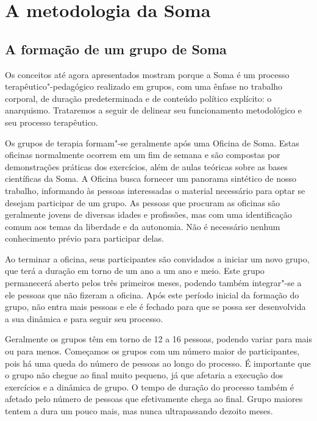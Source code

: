 \chapter*{A metodologia da Soma}

\section{A formação de um grupo de Soma}

Os conceitos até agora apresentados mostram porque a Soma é um processo
terapêutico"-pedagógico realizado em grupos, com uma ênfase no trabalho
corporal, de duração predeterminada e de conteúdo político explícito: o
anarquismo. Trataremos a seguir de delinear seu funcionamento
metodológico e seu processo terapêutico.

Os grupos de terapia formam"-se geralmente após uma Oficina de Soma.
Estas oficinas normalmente ocorrem em um fim de semana e são compostas
por demonstrações práticas dos exercícios, além de aulas teóricas sobre
as bases científicas da Soma. A Oficina busca fornecer um panorama
sintético de nosso trabalho, informando às pessoas interessadas o
material necessário para optar se desejam participar de um grupo. As
pessoas que procuram as oficinas são geralmente jovens de diversas
idades e profissões, mas com uma identificação comum aos temas da
liberdade e da autonomia. Não é necessário nenhum conhecimento prévio
para participar delas.

Ao terminar a oficina, seus participantes são convidados a iniciar um
novo grupo, que terá a duração em torno de um ano a um ano e meio. Este
grupo permanecerá aberto pelos três primeiros meses, podendo também
integrar"-se a ele pessoas que não fizeram a oficina. Após este período
inicial da formação do grupo, não entra mais pessoas e ele é fechado
para que se possa ser desenvolvida a sua dinâmica e para seguir seu
processo.

Geralmente os grupos têm em torno de 12 a 16 pessoas, podendo variar
para mais ou para menos. Começamos os grupos com um número maior de
participantes, pois há uma queda do número de pessoas ao longo do
processo. É importante que o grupo não chegue ao final muito pequeno, já
que afetaria a execução dos exercícios e a dinâmica de grupo. O tempo de
duração do processo também é afetado pelo número de pessoas que
efetivamente chega ao final. Grupo maiores tentem a dura um pouco mais,
mas nunca ultrapassando dezoito meses.

